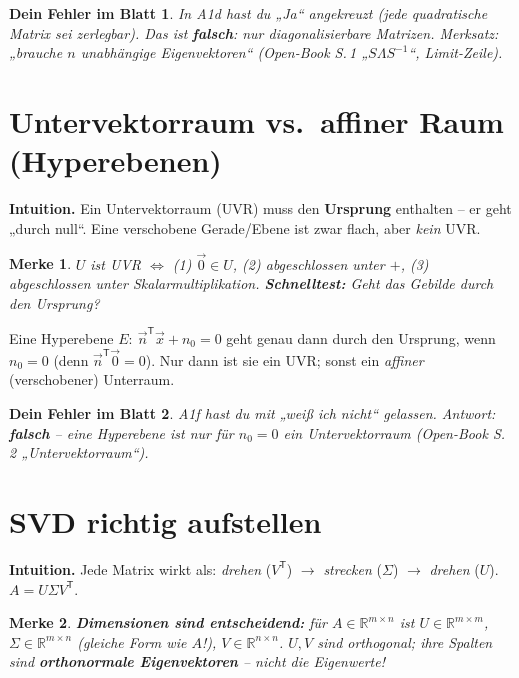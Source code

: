 \documentclass[a4paper,11pt]{article}
\newcommand{\transp}{^{\mathsf{T}}}
\theoremstyle{def0}
\newtheorem*{merke}{\textcolor{good}{Merke}}
\newtheorem*{fehler}{\textcolor{bad}{Dein Fehler im Blatt}}
\begin{document}
\begin{fehler}
In A1d hast du „Ja“ angekreuzt (jede quadratische Matrix sei zerlegbar). Das ist
\textbf{falsch}: nur diagonalisierbare Matrizen. Merksatz: „brauche $n$ unabhängige
Eigenvektoren“ (Open-Book S.\,1 „$S\Lambda S^{-1}$“, Limit-Zeile).
\end{fehler}

\section{Untervektorraum vs.\ affiner Raum (Hyperebenen)}

\textbf{Intuition.} Ein Untervektorraum (UVR) muss den \textbf{Ursprung} enthalten -- er
geht „durch null“. Eine verschobene Gerade/Ebene ist zwar flach, aber \emph{kein} UVR.

\begin{merke}
$U$ ist UVR $\iff$ (1) $\vec0\in U$, (2) abgeschlossen unter $+$, (3) abgeschlossen
unter Skalarmultiplikation. \textbf{Schnelltest:} Geht das Gebilde durch den Ursprung?
\end{merke}

Eine Hyperebene $E:\ \vec n\transp\vec x + n_0 = 0$ geht genau dann durch den Ursprung,
wenn $n_0=0$ (denn $\vec n\transp\vec0 = 0$). Nur dann ist sie ein UVR; sonst ein
\emph{affiner} (verschobener) Unterraum.

\begin{fehler}
A1f hast du mit „weiß ich nicht“ gelassen. Antwort: \textbf{falsch} -- eine Hyperebene
ist nur für $n_0=0$ ein Untervektorraum (Open-Book S.\,2 „Untervektorraum“).
\end{fehler}

\section{SVD richtig aufstellen}

\textbf{Intuition.} Jede Matrix wirkt als: \emph{drehen} ($V\transp$) $\to$
\emph{strecken} ($\Sigma$) $\to$ \emph{drehen} ($U$). $A=U\Sigma V\transp$.

\begin{merke}
\textbf{Dimensionen sind entscheidend:} für $A\in\mathbb{R}^{m\times n}$ ist
$U\in\mathbb{R}^{m\times m}$, $\Sigma\in\mathbb{R}^{m\times n}$ (\emph{gleiche Form wie}
$A$!), $V\in\mathbb{R}^{n\times n}$. $U,V$ sind \emph{orthogonal}; ihre Spalten sind
\textbf{orthonormale Eigenvektoren} -- nicht die Eigenwerte!
\end{merke}
\end{document}
